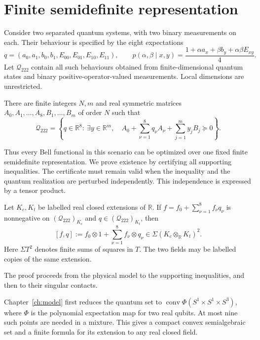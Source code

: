 \chapter{Finite semidefinite representation}
\label{ch:theorem}

Consider two separated quantum systems, with two binary measurements
on each. Their behaviour is specified by the eight expectations
\[
 q=(a_0,a_1,b_0,b_1,E_{00},E_{01},E_{10},E_{11}),\qquad
 p(\alpha,\beta\mid x,y)=
 \frac{1+\alpha a_x+\beta b_y+\alpha\beta E_{xy}}4.
\]
Let $\mathcal Q_{222}$ contain all such behaviours obtained from
finite-dimensional quantum states and binary positive-operator-valued
measurements. Local dimensions are unrestricted.

\begin{theorem}\label{thm:main}
There are finite integers $N,m$ and real symmetric matrices
$A_0,A_1,\ldots,A_8,B_1,\ldots,B_m$ of order $N$ such that
\[
 \mathcal Q_{222}=\left\{q\in\mathbb R^8:\ \exists y\in\mathbb R^m,\quad
 A_0+\sum_{\nu=1}^8q_\nu A_\nu+\sum_{j=1}^my_jB_j\succeq0\right\}.
\]
\end{theorem}

Thus every Bell functional in this scenario can be optimized over
one fixed finite semidefinite representation. We prove existence by
certifying all supporting inequalities. The certificate must remain
valid when the inequality and the quantum realization are perturbed
independently. This independence is expressed by a tensor product.

\begin{theorem}\label{thm:slack}
Let $K_c,K_t$ be labelled real closed extensions of $\mathbb R$.
If $f=f_0+\sum_{\nu=1}^8f_\nu q_\nu$ is nonnegative on
$(\mathcal Q_{222})_{K_c}$ and $q\in(\mathcal Q_{222})_{K_t}$, then
\[
 [f,q]:=f_0\otimes1+\sum_{\nu=1}^8f_\nu\otimes q_\nu
       \in\Sigma(K_c\otimes_{\mathbb R}K_t)^2.
\]
Here $\Sigma T^2$ denotes finite sums of squares in $T$.
The two fields may be labelled copies of the same extension.
\end{theorem}

The proof proceeds from the physical model to the supporting
inequalities, and then to their singular contacts.

Chapter~\ref{ch:model} first reduces the quantum set to
$\operatorname{conv}\Phi(S^1\times S^1\times S^3)$, where
$\Phi$ is the polynomial expectation map for two real qubits.
At most nine such points are needed in a mixture. This gives a
compact convex semialgebraic set and a finite formula for its
extension to any real closed field.

